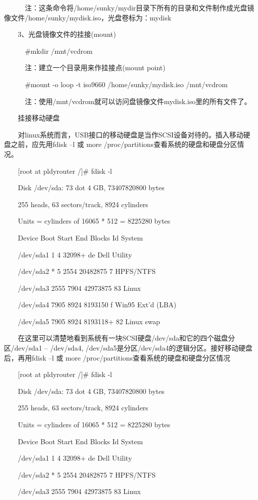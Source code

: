 \documentclass[11pt]{article}
\begin{document}
\begin{enumerate}
　　　注：这条命令将/home/sunky/mydir目录下所有的目录和文件制作成光盘镜像文件/home/sunky/mydisk.iso，光盘卷标为：mydisk

　　3、光盘镜像文件的挂接(mount)

　　　\#mkdir /mnt/vcdrom

　　　注：建立一个目录用来作挂接点(mount point)

　　　\#mount -o loop -t iso9660 /home/sunky/mydisk.iso /mnt/vcdrom

　　　注：使用/mnt/vcdrom就可以访问盘镜像文件mydisk.iso里的所有文件了。　　　

　　挂接移动硬盘

　　对linux系统而言，USB接口的移动硬盘是当作SCSI设备对待的。插入移动硬盘之前，应先用fdisk –l 或 more /proc/partitions查看系统的硬盘和硬盘分区情况。

　　[root at pldyrouter /]\# fdisk -l

　　Disk /dev/sda: 73 dot 4 GB, 73407820800 bytes

　　255 heads, 63 sectors/track, 8924 cylinders

　　Units = cylinders of 16065 * 512 = 8225280 bytes

　　Device Boot Start End Blocks Id System

　　/dev/sda1 1 4 32098+ de Dell Utility

　　/dev/sda2 * 5 2554 20482875 7 HPFS/NTFS

　　/dev/sda3 2555 7904 42973875 83 Linux

　　/dev/sda4 7905 8924 8193150 f Win95 Ext'd (LBA)

　　/dev/sda5 7905 8924 8193118+ 82 Linux swap

　　在这里可以清楚地看到系统有一块SCSI硬盘/dev/sda和它的四个磁盘分区/dev/sda1 -- /dev/sda4, /dev/sda5是分区/dev/sda4的逻辑分区。接好移动硬盘后，再用fdisk –l 或 more /proc/partitions查看系统的硬盘和硬盘分区情况

　　[root at pldyrouter /]\# fdisk -l

　　Disk /dev/sda: 73 dot 4 GB, 73407820800 bytes

　　255 heads, 63 sectors/track, 8924 cylinders

　　Units = cylinders of 16065 * 512 = 8225280 bytes

　　Device Boot Start End Blocks Id System

　　/dev/sda1 1 4 32098+ de Dell Utility

　　/dev/sda2 * 5 2554 20482875 7 HPFS/NTFS

　　/dev/sda3 2555 7904 42973875 83 Linux


\end{enumerate}
\end{document}
